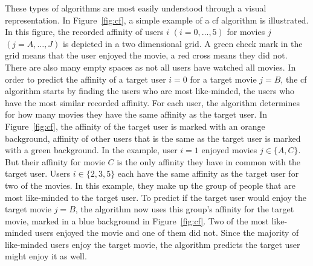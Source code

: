 These types of algorithms are most easily understood through a visual representation. 
In Figure~\ref{fig:cf}, a simple example of a \gls{cf} algorithm is illustrated.
In this figure, the recorded affinity of users $i$ $(i = 0,\dots,5)$ for movies $j$ $(j = A,\dots,J)$ is depicted in a two dimensional grid.
A green check mark in the grid means that the user enjoyed the movie, a red cross means they did not.
There are also many empty spaces as not all users have watched all movies.
In order to predict the affinity of a target user $i = 0$ for a target movie $j = B$, the \gls{cf} algorithm starts by finding the users who are most like-minded, the users who have the most similar recorded affinity.
For each user, the algorithm determines for how many movies they have the same affinity as the target user.
In Figure~\ref{fig:cf}, the affinity of the target user is marked with an orange background, affinity of other users that is the same as the target user is marked with a green background.
In the example, user $i = 1$ enjoyed movies $j \in \{A,C\}$.
But their affinity for movie $C$ is the only affinity they have in common with the target user.
Users $i \in \{2,3,5\}$ each have the same affinity as the target user for two of the movies. 
In this example, they make up the group of people that are most like-minded to the target user.
To predict if the target user would enjoy the target movie $j = B$, the algorithm now uses this group's affinity for the target movie, marked in a blue background in Figure~\ref{fig:cf}.
Two of the most like-minded users enjoyed the movie and one of them did not.
Since the majority of like-minded users enjoy the target movie, the algorithm predicts the target user might enjoy it as well.


